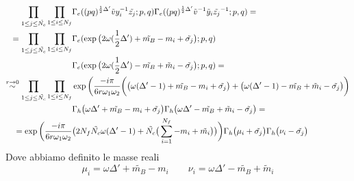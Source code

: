 \documentclass[a4paper,12pt]{article}
\begin{document}
\begin{align*}
 \prod_{ 1 \leq j \leq \tilde{N_c}} \prod_{ 1 \leq i \leq N_f} & \Gamma_e ( (pq)^{{1 \over 2 } \Delta'} \tilde{v} y_i^{-1} \tilde{z_j} ; p,q)\Gamma_e ( (pq)^{{1 \over 2 } \Delta'} \tilde{v}^{-1} \tilde y_i \tilde{z_j}^{-1} ; p,q)  = \\
 = \prod_{ 1 \leq j \leq \tilde{N_c}} \prod_{ 1 \leq i \leq N_f}  & \Gamma_e ( \exp\big( 2 \omega( {1 \over 2 } \Delta')   + \tilde{m_B} - m_i  + \tilde{\sigma_j} \big) ; p,q) \\
 &\Gamma_e ( \exp\big( 2 \omega(  {1 \over 2 } \Delta' )  - \tilde{m_B} + \tilde  m_i  - \tilde{\sigma_j} \big) ; p,q)  = \\
 \overset{ r \rightarrow 0 } { \sim } \prod_{ 1 \leq j \leq \tilde{N_c}} \prod_{ 1 \leq i \leq N_f}   &\exp \bigg( \frac{- i \pi }{6 r \omega_1 \omega_2} \bigg(  \big(\omega ( \Delta' - 1) + \tilde{m_B} - m_i  + \tilde{\sigma_j} \big)  +  \big( \omega (  \Delta' - 1) - \tilde{m_B} + \tilde m_i  - \tilde{\sigma_j}  \big)\bigg) \\
&\Gamma_h \big(\omega \Delta' + \tilde{m_B} - m_i  + \tilde{\sigma_j} \big) \Gamma_h \big(\omega \Delta' - \tilde{m_B} +  \tilde m_i  - \tilde{\sigma_j} \big)  = \\
 =   \exp \bigg( \frac{- i \pi }{6 r \omega_1 \omega_2} &\big( 2  N_f \tilde{N_c}\omega (\Delta' - 1 ) +  \tilde{N_c} \big( \sum_{i=1}^{N_f} - m_i + \tilde{m_i} \big)  \big) \bigg)  \Gamma_h \big( \mu_i + \tilde{\sigma_j} \big) \Gamma_h \big(\nu_i - \tilde{\sigma_j} \big)
\end{align*}
Dove abbiamo definito le masse reali
$$
 \mu_i = \omega \Delta' + \tilde{m_B} - m_i   \qquad \nu_i  = \omega \Delta' - \tilde{m_B} +  \tilde m_i
$$
\end{document}
